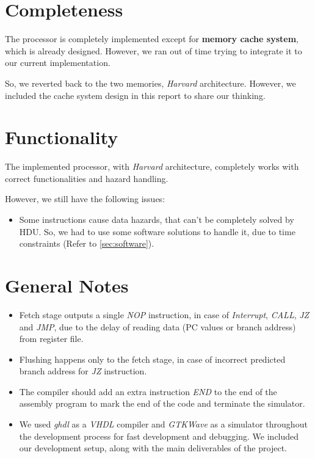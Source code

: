 \section{Completeness}
The processor is completely implemented except for \textbf{memory cache system}, which is already designed. However, we ran out of time trying to integrate it to our current implementation.

So, we reverted back to the two memories, \emph{Harvard} architecture. However, we included the cache system design in this report to share our thinking.

\section{Functionality}
The implemented processor, with \emph{Harvard} architecture, completely works with correct functionalities and hazard handling.

However, we still have the following issues:
\begin{itemize}
    \item Some instructions cause data hazards, that can't be completely solved by HDU. So, we had to use some software solutions to handle it, due to time constraints (Refer to \ref{sec:software}).
\end{itemize}

\section{General Notes}
\begin{itemize}
    \item Fetch stage outputs a single \emph{NOP} instruction, in case of \emph{Interrupt}, \emph{CALL}, \emph{JZ} and \emph{JMP}, due to the delay of reading data (PC values or branch address) from register file.
    \item Flushing happens only to the fetch stage, in case of incorrect predicted branch address for \emph{JZ} instruction.
    \item The compiler should add an extra instruction \emph{END} to the end of the assembly program to mark the end of the code and terminate the simulator.
    \item We used \emph{ghdl} as a \emph{VHDL} compiler and \emph{GTKWave} as a simulator throughout the development process for fast development and debugging. We included our development setup, along with the main deliverables of the project. 
\end{itemize}